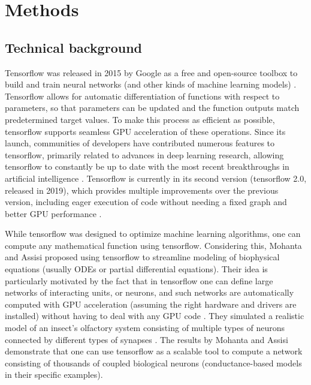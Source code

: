 \documentclass{report}
\begin{document}
\section{Methods}

\subsection{Technical background}

Tensorflow was released in 2015 by Google as a free and open-source toolbox to build and train neural networks (and other kinds of machine learning models) \cite{abadi2016tensorflow}. Tensorflow allows for automatic differentiation of functions with respect to parameters, so that parameters can be updated and the function outputs match predetermined target values. To make this process as efficient as possible, tensorflow supports seamless GPU acceleration of these operations. Since its launch, communities of developers have contributed numerous features to tensorflow, primarily related to advances in deep learning research, allowing tensorflow to constantly be up to date with the most recent breakthroughs in artificial intelligence \cite{abadi2016tensorflow}. Tensorflow is currently in its second version (tensorflow 2.0, released in 2019), which provides multiple improvements over the previous version, including eager execution of code without needing a fixed graph and better GPU performance \cite{campesato2019tensorflow}.

While tensorflow was designed to optimize machine learning algorithms, one can compute any mathematical function using tensorflow. Considering this, Mohanta and Assisi \cite{mohanta2019parallel} proposed using tensorflow to streamline modeling of biophysical equations (usually ODEs or partial differential equations). Their idea is particularly motivated by the fact that in tensorflow one can define large networks of interacting units, or neurons, and such networks are automatically computed with GPU acceleration (assuming the right hardware and drivers are installed) without having to deal with any GPU code \cite{mohanta2019parallel}. They simulated a realistic model of an insect's olfactory system consisting of multiple types of neurons connected by different types of synapses \cite{mohanta2019parallel}. The results by Mohanta and Assisi \cite{mohanta2019parallel} demonstrate that one can use tensorflow as a scalable tool to compute a network consisting of thousands of coupled biological neurons (conductance-based models in their specific examples).
\end{document}
